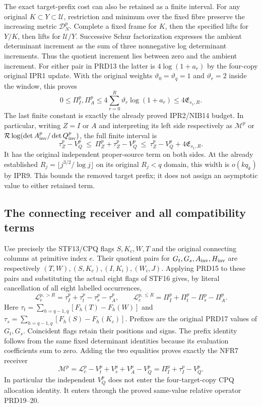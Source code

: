The exact target-prefix cost can also be retained as a finite interval.
For any original $K\subset Y\subset\mathcal U$, restriction and
minimum over the fixed fibre preserve the increasing metric
$\mathcal D_N^p$. Complete a fixed frame for $K$, then the
specified lifts for $Y/K$, then lifts for $\mathcal U/Y$.
Successive Schur factorization expresses the ambient determinant
increment as the sum of three nonnegative log determinant
increments. Thus the quotient increment lies between zero and
the ambient increment. For either pair in PRD13 the latter is
$4\log(1+a_r)$ by the four-copy original IPR1 update. With
the original weights $\vartheta_0=\vartheta_q=1$ and
$\vartheta_r=2$ inside the window, this proves
\[
 0\le\Pi_I^p,\Pi_A^p
 \le4\sum_{r=0}^R\vartheta_r\log(1+a_r)
 \le4\mathfrak E_{s_1,R}.                              \tag{PRD23}
\]
The last finite constant is exactly the already proved IPR2/NIB14
budget. In particular, writing $Z=I$ or $A$ and interpreting its
left side respectively as $\mathcal M^p$ or
$\mathcal R\log(\det A_{\rm inv}^p/\det Q_{\rm inv}^p)$,
the full finite interval is
\[
 \tau_Z^p-V_Q^p\ \le\ \Pi_Z^p+\tau_Z^p-V_Q^p
       \ \le\ \tau_Z^p-V_Q^p+4\mathfrak E_{s_1,R}.       \tag{PRD24}
\]
It has the original independent proper-source term on both sides.
At the already established $R_j=\lfloor j^{3/2}/\log j\rfloor$
on its original $R_j<q$ domain, this width is $o(kq_k)$ by
IPR9. This bounds the removed target prefix; it does not assign
an asymptotic value to either retained term.

\subsection{The connecting receiver and all compatibility terms}
Use precisely the STF13/CPQ flags $S,K_c,W,T$ and the original
connecting columns at primitive index $e$. Their quotient pairs
for $G_t,G_s,A_{\rm inv},H_{\rm inv}$ are respectively
$(T,W),(S,K_c),(I,K_i),(W_i,J)$. Applying PRD15 to these pairs
and substituting the actual eight flags of STF16 gives, by
literal cancellation of all eight labelled occurrences,
\[
 \mathcal L_e^{p,>R}
  =\tau_I^p+\tau_t^p-\tau_s^p-\tau_A^p,\qquad
 \mathcal L_e^{p,\le R}
  =\Pi_I^p+\Pi_t^p-\Pi_s^p-\Pi_A^p.                    \tag{PRD25}
\]
Here $\tau_t=\sum_{h=q-1,q}[F_h(T)-F_h(W)]$ and
$\tau_s=\sum_{h=q-1,q}[F_h(S)-F_h(K_c)]$.
Prefixes are the original PRD17 values
of $G_t,G_s$. Coincident flags retain their positions and signs.
The prefix identity follows from the same fixed determinant
identities because its evaluation coefficients sum to zero.
Adding the two equalities proves exactly the NFR7 receiver
\[
 \mathcal M^p
 =\mathcal L_e^p-V_t^p+V_s^p+V_A^p-V_Q^p
 =\Pi_I^p+\tau_I^p-V_Q^p.                              \tag{PRD26}
\]
In particular the independent $V_Q^p$ does not enter the
four-target-copy CPQ allocation identity. It enters through the
proved same-value relative operator PRD19--20.

